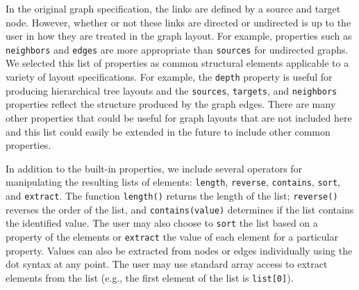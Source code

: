 In the original graph specification, the links are defined by a source
and target node. However, whether or not these links are
directed or undirected is up to the user in how they
are treated in the graph layout. For example, properties such as
\texttt{neighbors} and \texttt{edges} are more appropriate than \texttt{sources}
for undirected graphs. We selected this list of properties as common structural elements
applicable to a variety of layout specifications. For example, the \texttt{depth}
property is useful for producing hierarchical tree layouts and the 
\texttt{sources}, \texttt{targets}, and \texttt{neighbors} properties
reflect the structure produced by the graph edges. There are many other
properties that could be useful for graph layouts that are not included 
here and this list could easily be extended in the future to include other
common properties.

In addition to the built-in properties, we include several operators for 
manipulating the resulting lists of elements: \texttt{length}, \texttt{reverse},
\texttt{contains}, \texttt{sort}, and \texttt{extract}. The function 
\texttt{length()} returns the length of the list; \texttt{reverse()} 
reverses the order of the list, and \texttt{contains(value)} determines if
the list contains the identified value. The user may also choose to \texttt{sort} 
the list based on a property of the elements or \texttt{extract} the value of each
element for a particular property. Values can also be extracted from
nodes or edges individually using the dot syntax at any point. The user may use standard
array access to extract elements from the list (e.g., the first element of
the list is \texttt{list[0]}).


